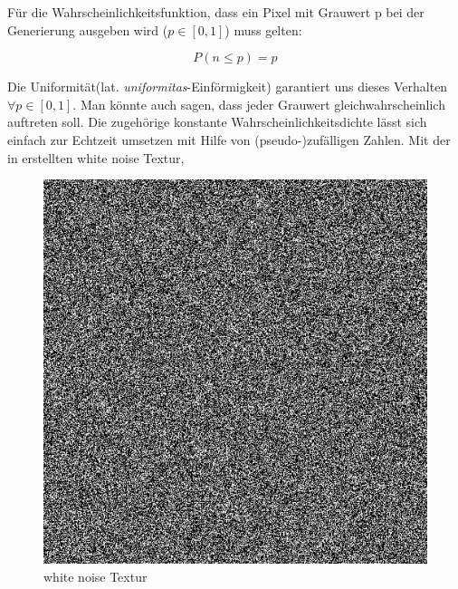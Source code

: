 Für die Wahrscheinlichkeitsfunktion, dass
ein Pixel mit Grauwert p bei der Generierung ausgeben wird  ($\textit{p} \in [0,1]$) muss gelten: 

\begin{equation}\label{eq:Uniformitätsgleichung}
    P(n \leq p) = p
\end{equation}

Die Uniformität(lat. \textit{uniformitas}-Einförmigkeit) garantiert uns dieses
Verhalten $\forall p \in [0,1]$. Man könnte auch sagen, dass jeder Grauwert gleichwahrscheinlich
auftreten soll. Die zugehörige konstante Wahrscheinlichkeitsdichte
lässt sich einfach zur Echtzeit umsetzen mit Hilfe von (pseudo-)zufälligen Zahlen.
Mit der in \cite{WhiteNoiseGenerator} erstellten white noise Textur,
\label{pic:white noise}
\begin{figure}[H]
    \centering
    \begin{minipage}[t]{0.45\linewidth}
        \centering
        \includegraphics[width=\linewidth]{content/BlueNoise/Bilder/whitenoise.png}
        \caption{white noise Textur}
    \end{minipage}
    \hfill
    \begin{minipage}[t]{0.45\linewidth}
        \centering

\end{minipage}
\end{figure}
